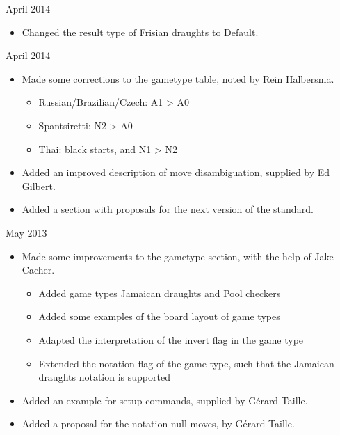 \documentclass[letterpaper,10pt,english]{sphinxmanual}
\begin{document}
 April 2014
\begin{itemize}
\item {} 
\sphinxAtStartPar
Changed the result type of Frisian draughts to Default.

\end{itemize}

 April 2014
\begin{itemize}
\item {} 
\sphinxAtStartPar
Made some corrections to the gametype table, noted by Rein Halbersma.
\begin{itemize}
\item {} 
\sphinxAtStartPar
Russian/Brazilian/Czech: A1 \sphinxhyphen{}\textgreater{} A0

\item {} 
\sphinxAtStartPar
Spantsiretti: N2 \sphinxhyphen{}\textgreater{} A0

\item {} 
\sphinxAtStartPar
Thai: black starts, and N1 \sphinxhyphen{}\textgreater{} N2

\end{itemize}

\item {} 
\sphinxAtStartPar
Added an improved description of move disambiguation, supplied by Ed Gilbert.

\item {} 
\sphinxAtStartPar
Added a section with proposals for the next version of the standard.

\end{itemize}

 May 2013
\begin{itemize}
\item {} 
\sphinxAtStartPar
Made some improvements to the gametype section, with the help of Jake Cacher.
\begin{itemize}
\item {} 
\sphinxAtStartPar
Added game types Jamaican draughts and Pool checkers

\item {} 
\sphinxAtStartPar
Added some examples of the board layout of game types

\item {} 
\sphinxAtStartPar
Adapted the interpretation of the invert flag in the game type

\item {} 
\sphinxAtStartPar
Extended the notation flag of the game type, such that the Jamaican draughts notation is supported

\end{itemize}

\item {} 
\sphinxAtStartPar
Added an example for setup commands, supplied by Gérard Taille.

\item {} 
\sphinxAtStartPar
Added a proposal for the notation null moves, by Gérard Taille.

\end{itemize}
\end{document}
